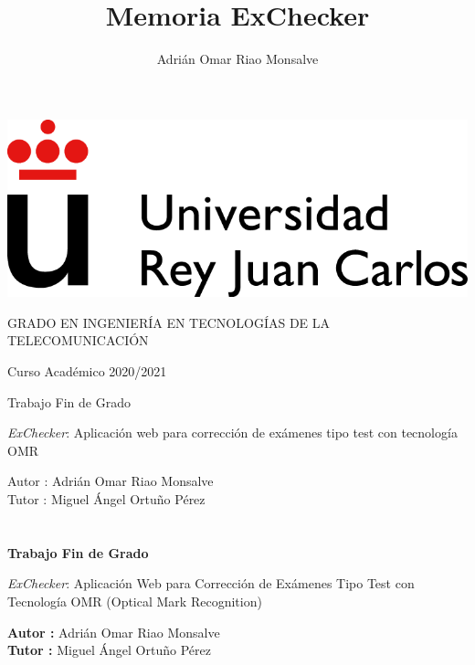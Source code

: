 \documentclass[a4paper, 12pt]{book}
\title{Memoria ExChecker}
\author{Adrián Omar Riao Monsalve}
\begin{document}
\renewcommand{\refname}{Bibliografía}  %
\renewcommand{\appendixname}{Apéndice}


\begin{titlepage}
\begin{center}
\includegraphics[scale=0.8]{img/URJ_logo_Color_POS.png}

\vspace{1.75cm}

\Large
GRADO EN INGENIERÍA EN TECNOLOGÍAS
DE LA TELECOMUNICACIÓN

\vspace{0.4cm}

\large
Curso Académico 2020/2021

\vspace{0.8cm}

Trabajo Fin de Grado

\vspace{2.5cm}

\LARGE
\textit{ExChecker}: Aplicación web para
corrección de exámenes tipo test con tecnología
OMR

\vspace{4cm}

\large
Autor : Adrián Omar Riao Monsalve\\
Tutor : Miguel Ángel Ortuño Pérez
\end{center}
\end{titlepage}

\newpage
\mbox{}
\thispagestyle{empty} %


\clearpage
{}
\chapter*{}

\vspace{-4cm}
\begin{center}
\LARGE
\textbf{Trabajo Fin de Grado}

\vspace{1cm}
\large
\textit{ExChecker}: Aplicación Web para
Corrección de Exámenes Tipo Test con Tecnología
OMR (Optical Mark Recognition)

\vspace{1cm}
\large
\textbf{Autor :} Adrián Omar Riao Monsalve \\
\textbf{Tutor :} Miguel Ángel Ortuño Pérez

\end{center}
\end{document}
